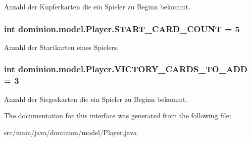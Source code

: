 \-Anzahl der \-Kupferkarten die ein \-Spieler zu \-Beginn bekommt. \hypertarget{interfacedominion_1_1model_1_1Player_a332beaafb8b0f1c569d512bcdb7e3790}{
\subsubsection[{\-S\-T\-A\-R\-T\-\_\-\-C\-A\-R\-D\-\_\-\-C\-O\-U\-N\-T}]{\setlength{\rightskip}{0pt plus 5cm}int {\bf dominion.\-model.\-Player.\-S\-T\-A\-R\-T\-\_\-\-C\-A\-R\-D\-\_\-\-C\-O\-U\-N\-T} = 5}}\label{interfacedominion_1_1model_1_1Player_a332beaafb8b0f1c569d512bcdb7e3790}
\-Anzahl der \-Startkarten eines \-Spielers. \hypertarget{interfacedominion_1_1model_1_1Player_ae50f344d32fbc00a964ad8afcc2980d5}{
\subsubsection[{\-V\-I\-C\-T\-O\-R\-Y\-\_\-\-C\-A\-R\-D\-S\-\_\-\-T\-O\-\_\-\-A\-D\-D}]{\setlength{\rightskip}{0pt plus 5cm}int {\bf dominion.\-model.\-Player.\-V\-I\-C\-T\-O\-R\-Y\-\_\-\-C\-A\-R\-D\-S\-\_\-\-T\-O\-\_\-\-A\-D\-D} = 3}}\label{interfacedominion_1_1model_1_1Player_ae50f344d32fbc00a964ad8afcc2980d5}
\-Anzahl der \-Siegeskarten die ein \-Spieler zu \-Beginn bekommt. 

\-The documentation for this interface was generated from the following file\-:\begin{DoxyCompactItemize}
\item 
src/main/java/dominion/model/\-Player.\-java\end{DoxyCompactItemize}
